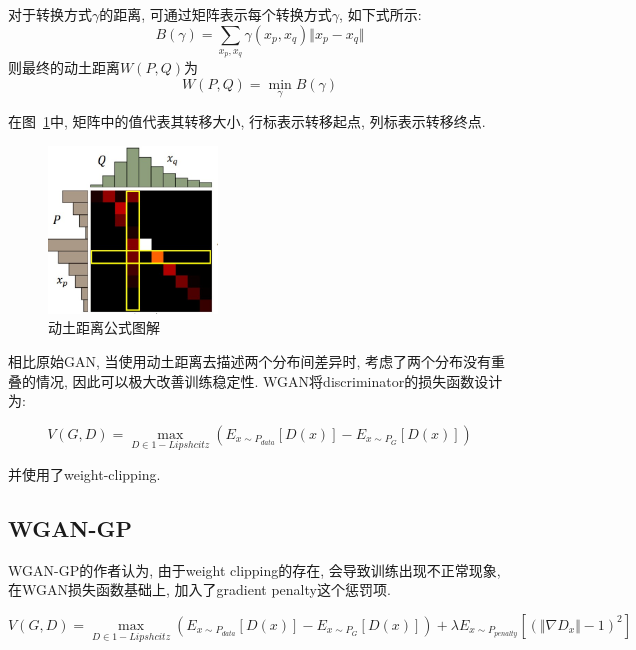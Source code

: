 对于转换方式$\gamma$的距离, 可通过矩阵表示每个转换方式$\gamma$, 如下式所示:
\begin{equation}
    B(\gamma) = \sum_{x_{p}, x_{q}} \gamma(x_{p}, x_{q})\Vert x_{p} - x_{q} \Vert
\end{equation}
则最终的动土距离$W(P,Q)$为
\begin{equation}
    W(P,Q) = \min \limits_{\gamma} B(\gamma)
\end{equation}

在图~\ref{fig:0203}中, 矩阵中的值代表其转移大小, 行标表示转移起点, 列标表示转移终点. 
\begin{figure}[!htbp]
    \centering
    \includegraphics[height=12em]{pic/pic0203.jpg}
    \caption{动土距离公式图解}
    \label{fig:0203}
\end{figure}

相比原始GAN, 当使用动土距离去描述两个分布间差异时, 考虑了两个分布没有重叠的情况, 因此可以极大改善训练稳定性. WGAN将discriminator的损失函数设计为:

\begin{equation}
    V(G,D)=\max \limits_{D\in 1-Lipshcitz}(E_{x\sim P_{data}}[D(x)] - E_{x\sim P_{G}}[D(x)])
\end{equation}

并使用了weight-clipping.


\subsection{WGAN-GP}
WGAN-GP的作者认为, 由于weight clipping的存在, 会导致训练出现不正常现象, 在WGAN损失函数基础上, 加入了gradient penalty这个惩罚项. 

\begin{equation}
    V(G,D)=\max \limits_{D\in 1-Lipshcitz}(E_{x\sim P_{data}}[D(x)] - E_{x\sim P_{G}}[D(x)]) + \lambda E_{x\sim P_{penalty}}[(\Vert \nabla D_{x} \Vert - 1)^{2}]
\end{equation}

